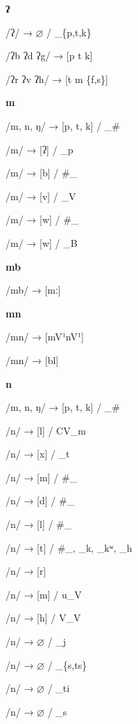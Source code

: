 \begin{center}\textbf{ʔ}\end{center}
\begin{multicols}{4}
\noindent /ʔ/ → $\varnothing$ / \_\{p,t,k\}

\noindent /ʔb ʔd ʔg/ → [p t k]

\noindent /ʔr ʔv ʔh/ → [t m \{f,s\}]
\end{multicols}


\begin{center}\textbf{m}\end{center}
\begin{multicols}{4}
\noindent /m, n, ŋ/ → [p, t, k] / \_\#

\noindent /m/ → [ʔ] / \_p

\noindent /m/ → [b] / \#\_

\noindent /m/ → [v] / \_V

\noindent /m/ → [w] / \#\_

\noindent /m/ → [w] / \_B
\end{multicols}


\begin{center}\textbf{mb}\end{center}
\begin{multicols}{4}
\noindent /mb/ → [mː]
\end{multicols}


\begin{center}\textbf{mn}\end{center}
\begin{multicols}{4}
\noindent /mn/ → [mV¹nV¹]

\noindent /mn/ → [bl]
\end{multicols}


\begin{center}\textbf{n}\end{center}
\begin{multicols}{4}
\noindent /m, n, ŋ/ → [p, t, k] / \_\#

\noindent /n/ → [l] / CV\_m

\noindent /n/ → [x] / \_t

\noindent /n/ → [m] / \#\_

\noindent /n/ → [d] / \#\_

\noindent /n/ → [l] / \#\_

\noindent /n/ → [t] / \#\_, \_k, \_kʷ, \_h

\noindent /n/ → [r]

\noindent /n/ → [m] / u\_V

\noindent /n/ → [h] / V\_V

\noindent /n/ → $\varnothing$ / \_j

\noindent /n/ → $\varnothing$ / \_\{s,ts\}

\noindent /n/ → $\varnothing$ / \_ti

\noindent /n/ → $\varnothing$ / \_s
\end{multicols}

